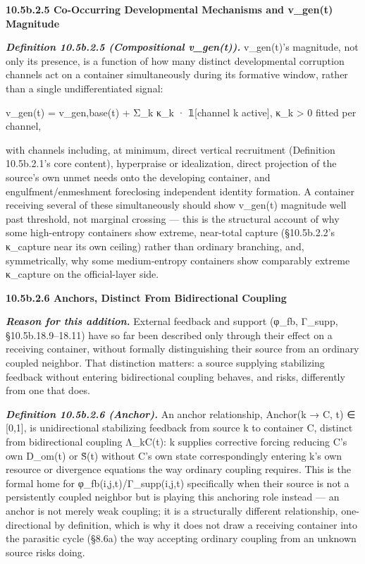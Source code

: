 \documentclass[
]{article}
\begin{document}
\textbf{10.5b.2.5 Co-Occurring Developmental Mechanisms and v\_gen(t)
Magnitude}

\emph{\textbf{Definition 10.5b.2.5 (Compositional v\_gen(t)).}}
v\_gen(t)'s magnitude, not only its presence, is a function of how many
distinct developmental corruption channels act on a container
simultaneously during its formative window, rather than a single
undifferentiated signal:

v\_gen(t) = v\_gen,base(t) + Σ\_k κ\_k · 𝟙{[}channel k active{]}, κ\_k
\textgreater{} 0 fitted per channel,

with channels including, at minimum, direct vertical recruitment
(Definition 10.5b.2.1's core content), hyperpraise or idealization,
direct projection of the source's own unmet needs onto the developing
container, and engulfment/enmeshment foreclosing independent identity
formation. A container receiving several of these simultaneously should
show v\_gen(t) magnitude well past threshold, not marginal crossing ---
this is the structural account of why some high-entropy containers show
extreme, near-total capture (§10.5b.2.2's κ\_capture near its own
ceiling) rather than ordinary branching, and, symmetrically, why some
medium-entropy containers show comparably extreme κ\_capture on the
official-layer side.

\textbf{10.5b.2.6 Anchors, Distinct From Bidirectional Coupling}

\emph{\textbf{Reason for this addition.}} External feedback and support
(φ\_fb, Γ\_supp, §10.5b.18.9--18.11) have so far been described only
through their effect on a receiving container, without formally
distinguishing their source from an ordinary coupled neighbor. That
distinction matters: a source supplying stabilizing feedback without
entering bidirectional coupling behaves, and risks, differently from one
that does.

\emph{\textbf{Definition 10.5b.2.6 (Anchor).}} An anchor relationship,
Anchor(k → C, t) ∈ {[}0,1{]}, is unidirectional stabilizing feedback
from source k to container C, distinct from bidirectional coupling
Λ\_kC(t): k supplies corrective forcing reducing C's own D\_om(t) or
S̃(t) without C's own state correspondingly entering k's own resource or
divergence equations the way ordinary coupling requires. This is the
formal home for φ\_fb(i,j,t)/Γ\_supp(i,j,t) specifically when their
source is not a persistently coupled neighbor but is playing this
anchoring role instead --- an anchor is not merely weak coupling; it is
a structurally different relationship, one-directional by definition,
which is why it does not draw a receiving container into the parasitic
cycle (§8.6a) the way accepting ordinary coupling from an unknown source
risks doing.
\end{document}
